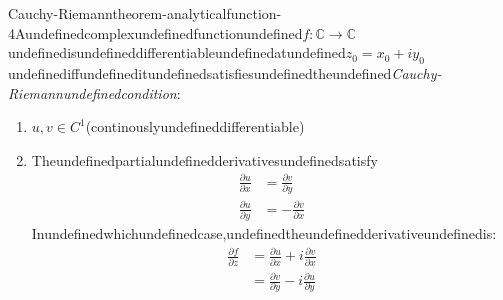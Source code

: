 \begin{mystthmtheorem}{Cauchy-Riemann}{theorem-analyticalfunction-4}Aundefinedcomplexundefinedfunctionundefined$f:\mathbb{C} \to \mathbb{C}$undefinedisundefineddifferentiableundefinedatundefined$z_0=x_0+iy_0$undefinediffundefineditundefinedsatisfiesundefinedtheundefined\textit{Cauchy-Riemannundefinedcondition}:

\begin{enumerate}
\item $u,v\in C^1$(continouslyundefineddifferentiable)
\item Theundefinedpartialundefinedderivativesundefinedsatisfy
\begin{equation}
\begin{aligned}
\frac{\partial u}{\partial x} &= \frac{\partial v}{\partial y} \\
\frac{\partial u}{\partial y} &= -\frac{\partial v}{\partial x}
\end{aligned}
\end{equation}
Inundefinedwhichundefinedcase,undefinedtheundefinedderivativeundefinedis:
\begin{equation}
\begin{aligned}
\frac{\partial f}{\partial z} &= \frac{\partial u}{\partial x} + i \frac{\partial v}{\partial x} \\
&= \frac{\partial v}{\partial y} - i \frac{\partial u}{\partial y}
\end{aligned}
\end{equation}
\end{enumerate}

\end{mystthmtheorem}
